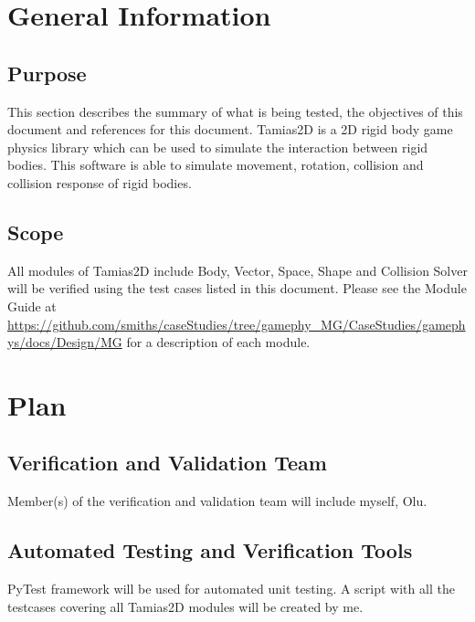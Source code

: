 \documentclass[12pt, titlepage]{article}
\newcommand{\progname}{Tamias2D}
\begin{document}

\section{General Information}
\subsection{Purpose}

This section describes the summary of what is being tested, the objectives of this document and references for this document. \progname{} is a 2D rigid body game physics library which can be used to simulate the interaction between rigid bodies. This software is able to simulate movement, rotation, collision and collision response of rigid bodies.

\subsection{Scope}

All modules of \progname{} include Body, Vector, Space, Shape and Collision Solver will be verified using the test cases listed in this document. Please see the Module Guide at \url{https://github.com/smiths/caseStudies/tree/gamephy_MG/CaseStudies/gamephys/docs/Design/MG} for a description of each module.

\section{Plan}
	
\subsection{Verification and Validation Team}

Member(s) of the verification and validation team will include myself, Olu.

\subsection{Automated Testing and Verification Tools}

PyTest framework will be used for automated unit testing. A script with all the testcases covering all \progname{} modules will be created by me.
\end{document}
